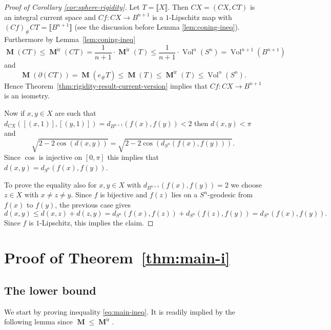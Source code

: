 \documentclass[reqno]{amsart}
\numberwithin{equation}{section}
\newcommand{\vol}{\operatorname{Vol}}
\newcommand{\bb}[1]{\llbracket #1\rrbracket}
\DeclareMathOperator{\mass}{\mathbf{M}}
\DeclareMathOperator{\ir}{ir}
\begin{document}
\begin{proof}[Proof of Corollary \ref{cor:sphere-rigidity}]
Let $T=\bb{X}$. Then $CX=(CX,CT)$ is an integral current space and $Cf\colon CX\to B^{n+1}$ is a $1$-Lipschitz map with $(Cf)_{\#} CT=\bb{B^{n+1}}$ (see the discussion before Lemma \ref{lem:coning-ineq}). Furthermore by Lemma~\ref{lem:coning-ineq}
\begin{equation}
    \mass(CT)\leq \mass^{\ir}(CT)=\frac{1}{n+1}\cdot \mass^{\ir}(T)\leq \frac{1}{n+1}\cdot \vol^{n}(S^n)=\vol^{n+1}(B^{n+1})
\end{equation}
and
\begin{equation}
    \mass(\partial(CT))=\mass(e_{\#}T)\leq \mass(T)\leq \mass^{\ir}(T)\leq \vol^{n}(S^n).
\end{equation}
Hence Theorem~\ref{thm:rigidity-result-current-version} implies that $Cf\colon CX\to B^{n+1}$ is an isometry.

Now if $x,y\in X$ are such that $d_{CX}([(x,1)],[(y,1)])=d_{B^{n+1}}(f(x),f(y))<2$ then $d(x,y)<\pi$ and
\begin{equation}
    \sqrt{2-2\cos(d(x,y))}=\sqrt{2-2\cos\left(d_{S^n}(f(x),f(y))\right)}.
\end{equation}
Since $\cos$ is injective on $[0,\pi]$ this implies that $d(x,y)=d_{S^n}(f(x),f(y))$.

To prove the equality also for $x,y\in X$ with $d_{B^{n+1}}(f(x),f(y))=2$ we choose $z\in X$ with $x\neq z\neq y$. Since $f$ is bijective and $f(z)$ lies on a $S^{n}$-geodesic from $f(x)$ to $f(y)$, the previous case gives
\begin{equation}
    d(x,y)\leq d(x,z)+d(z,y)=d_{S^n}(f(x),f(z))+d_{S^n}(f(z),f(y))=d_{S^n}(f(x),f(y)).
\end{equation}
Since $f$ is $1$-Lipschitz, this implies the claim.
\end{proof}

\section{Proof of Theorem~\ref{thm:main-i}}\label{sec:6}

\subsection{The lower bound}\label{sec:6.1}
We start by proving inequality \eqref{eq:main-ineq}. It is readily implied by the following lemma since $\mass \leq \mass^{\ir}$.
\end{document}
